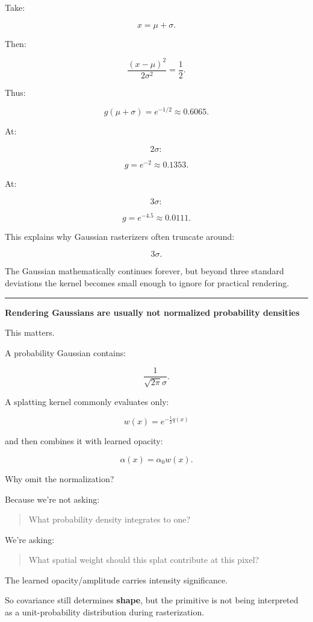 Take:

\[
x=\mu+\sigma.
\]

Then:

\[
\frac{(x-\mu)^2}{2\sigma^2}
=
\frac12.
\]

Thus:

\[
g(\mu+\sigma)
=
e^{-1/2}
\approx0.6065.
\]

At:

\[
2\sigma:
\]

\[
g=e^{-2}
\approx0.1353.
\]

At:

\[
3\sigma:
\]

\[
g=e^{-4.5}
\approx0.0111.
\]

This explains why Gaussian rasterizers often truncate around:

\[
3\sigma.
\]

The Gaussian mathematically continues forever, but beyond three standard deviations the kernel becomes small enough to ignore for practical rendering.

\begin{center}\rule{0.5\linewidth}{0.5pt}\end{center}

\textbf{Rendering Gaussians are usually not normalized probability densities}

This matters.

A probability Gaussian contains:

\[
\frac{1}{\sqrt{2\pi}\sigma}.
\]

A splatting kernel commonly evaluates only:

\[
\boxed{
w(x)=
e^{-\frac12 q(x)}
}
\]

and then combines it with learned opacity:

\[
\alpha(x)
=
\alpha_0w(x).
\]

Why omit the normalization?

Because we're not asking:

\begin{quote}
What probability density integrates to one?
\end{quote}

We're asking:

\begin{quote}
What spatial weight should this splat contribute at this pixel?
\end{quote}

The learned opacity/amplitude carries intensity significance.

So covariance still determines \textbf{shape}, but the primitive is not being interpreted as a unit-probability distribution during rasterization.

